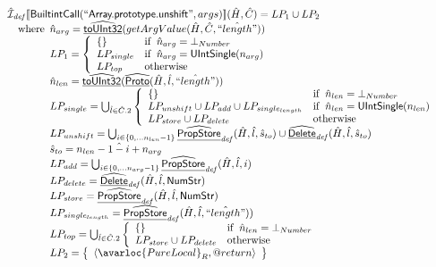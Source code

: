 \[
\begin{array}{l}

\aI_{\it def}\lbr \SF{BuiltintCall}(``\SF{Array.prototype.unshift}",args)\rbr(\hat{H},\hat{C}) = LP_1 \cup LP_2\\
\quad\wherec{
  \hat{n}_{arg} = \ahf{toUInt32}(getArgValue(\hat{H}, \hat{C}, \hat{``length"}))\\
  LP_1 = \left\{\begin{array}{ll}
      \set{} & \ifc{\hat{n}_{arg} = \bot_{Number}}\\
      LP_{single} & \ifc{\hat{n}_{arg} = \SF{UIntSingle}(n_{arg})}\\
      LP_{top} & \owc
    \end{array}\right.\\
  \hat{n}_{len} = \ahf{toUInt32}(\ahf{Proto}(\hat{H}, \hat{l}, \hat{``length"}))\\    
  LP_{single} = \bigcup_{\hat{l} \in \hat{C}.2}  \left\{\begin{array}{ll}
      \set{} & \ifc{\hat{n}_{len} = \bot_{Number}}\\
      LP_{unshift} \cup LP_{add} \cup LP_{single_{length}} & \ifc{\hat{n}_{len} = \SF{UIntSingle}(n_{len})}\\
      LP_{store} \cup LP_{delete} & \owc
    \end{array}\right.\\
  LP_{unshift} = \bigcup_{i \in \{0,...n_{len}-1\} }\ahf{PropStore}_{\it def}(\hat{H}, \hat{l}, \hat{s}_{to}) \cup \ahf{Delete}_{\it def}(\hat{H}, \hat{l}, \hat{s}_{to})\\
  \hat{s}_{to} = \hat{n_{len} -1 -i + n_{arg}}\\
  LP_{add} = \bigcup_{i \in \{0,...n_{arg}-1\} }\ahf{PropStore}_{\it def}(\hat{H}, \hat{l}, i)\\
  LP_{delete} = \ahf{Delete}_{\it def}(\hat{H}, \hat{l}, \SF{NumStr})\\
  LP_{store} = \ahf{PropStore}_{\it def}(\hat{H}, \hat{l}, \SF{NumStr})\\
  LP_{single_{length}} = \ahf{PropStore}_{\it def}(\hat{H}, \hat{l}, \hat{``length"}))\\
  LP_{top} = \bigcup_{\hat{l} \in \hat{C}.2}  \left\{\begin{array}{ll}
      \set{} & \ifc{\hat{n}_{len} = \bot_{Number}}\\
      LP_{store} \cup LP_{delete} & \owc
    \end{array}\right.\\
  LP_2 = \set{\langle\avarloc{PureLocal}_R,\varprop{return}\rangle}\\
  }\\
\\




\end{array}\]
